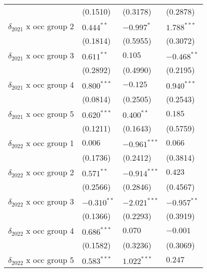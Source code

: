 \begin{tabular}{llll}
                                         &           (0.1510) &           (0.3178) &           (0.2878) \\
$\delta_{2021}$ x occ group 2            &       $0.444^{**}$ &         $-0.997^*$ &      $1.788^{***}$ \\
                                         &           (0.1814) &           (0.5955) &           (0.3072) \\
$\delta_{2021}$ x occ group 3            &       $0.611^{**}$ &            $0.105$ &      $-0.468^{**}$ \\
                                         &           (0.2892) &           (0.4990) &           (0.2195) \\
$\delta_{2021}$ x occ group 4            &      $0.800^{***}$ &           $-0.125$ &      $0.940^{***}$ \\
                                         &           (0.0814) &           (0.2505) &           (0.2543) \\
$\delta_{2021}$ x occ group 5            &      $0.620^{***}$ &       $0.400^{**}$ &            $0.185$ \\
                                         &           (0.1211) &           (0.1643) &           (0.5759) \\
$\delta_{2022}$ x occ group 1            &            $0.006$ &     $-0.961^{***}$ &            $0.066$ \\
                                         &           (0.1736) &           (0.2412) &           (0.3814) \\
$\delta_{2022}$ x occ group 2            &       $0.571^{**}$ &     $-0.914^{***}$ &            $0.423$ \\
                                         &           (0.2566) &           (0.2846) &           (0.4567) \\
$\delta_{2022}$ x occ group 3            &      $-0.310^{**}$ &     $-2.021^{***}$ &      $-0.957^{**}$ \\
                                         &           (0.1366) &           (0.2293) &           (0.3919) \\
$\delta_{2022}$ x occ group 4            &      $0.686^{***}$ &            $0.070$ &           $-0.001$ \\
                                         &           (0.1582) &           (0.3236) &           (0.3069) \\
$\delta_{2022}$ x occ group 5            &      $0.583^{***}$ &      $1.022^{***}$ &            $0.247$ \\

\end{tabular}
